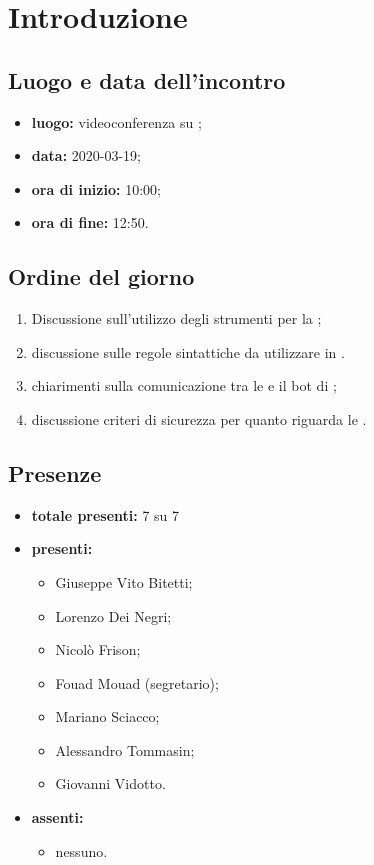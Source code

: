 \section*{Introduzione}

\subsection*{Luogo e data dell'incontro}
	\begin{itemize}
		\item \textbf{luogo:} videoconferenza su ;
		\item \textbf{data:} 2020-03-19;
		\item \textbf{ora di inizio:} 10:00;
		\item \textbf{ora di fine:} 12:50.
	\end{itemize}

\subsection*{Ordine del giorno}
	\begin{enumerate}
			\item Discussione sull'utilizzo degli strumenti per la ;
			\item discussione sulle regole sintattiche da utilizzare in .
			\item chiarimenti sulla comunicazione tra le  e il bot di ;
			\item discussione criteri di sicurezza per quanto riguarda le .
	\end{enumerate}

\subsection*{Presenze}
	\begin{itemize}
		\item \textbf{totale presenti:} 7 su 7
		\item \textbf{presenti: }
			\begin{itemize}
				\item Giuseppe Vito Bitetti;
				\item Lorenzo Dei Negri;
				\item Nicolò Frison;
				\item Fouad Mouad (segretario);
				\item Mariano Sciacco;
				\item Alessandro Tommasin;
				\item Giovanni Vidotto.
			\end{itemize}
		\item \textbf{assenti: }
			\begin{itemize}
				\item nessuno.
			\end{itemize}
	\end{itemize}


